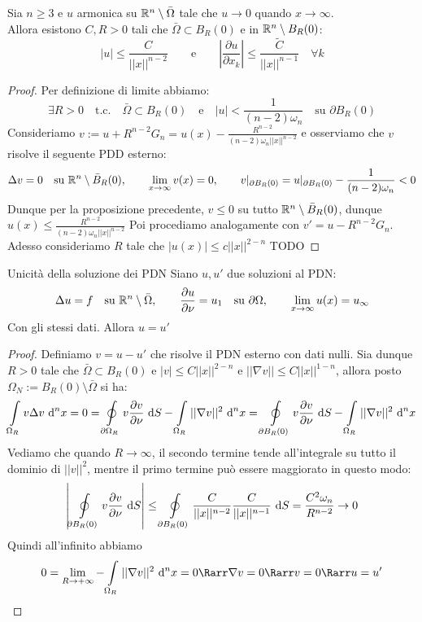 \documentclass{book}
\begin{document}
\begin{theorem}{}{}
    Sia $n\ge 3$ e $u$ armonica su $\mathbb{R}^n\setminus \bar{\Omega}$ tale che $u\to 0$ quando $x\to\infty$.\\
    Allora esistono $C,R>0$ tali che $\bar{\Omega}\subset B_R(0)$ e in $\mathbb{R}^n\setminus B_R(0)$:
    \[|u| \le \frac{C}{||x||^{n-2}}\qquad \text{e}\qquad \left|\frac{\partial u}{\partial x_k}\right|\le \frac{\tilde{C}}{||x||^{n-1}} \quad \forall k\]
\end{theorem}
\begin{proof}
    Per definizione di limite abbiamo:
    \[\exists R>0 \quad \text{t.c.} \quad \bar{\Omega}\subset B_R(0) \quad \text{e} \quad |u| <\frac{1}{(n-2)\omega_n} \quad \text{su } \partial B_R(0)\]
    Consideriamo $v:= u + R^{n-2}G_n = u(x) - \frac{R^{n-2}}{(n-2)\omega_n ||x||^{n-2}}$ e osserviamo che $v$ risolve il seguente PDD esterno:
    \[\Delta v = 0 \quad\text{su }\mathbb{R}^n \setminus\bar{B}_R(0), \qquad \lim_{x\to\infty}v(x) = 0, \qquad v|_{\partial B_R(0)} = u|_{\partial B_R(0)} - \frac{1}{(n-2)\omega_n} < 0\]
    Dunque per la proposizione precedente, $v \le 0$ su tutto $\mathbb{R}^n \setminus\bar{B}_R(0)$, dunque $u(x) \le \frac{R^{n-2}}{(n-2)\omega_n ||x||^{n-2}}$
    Poi procediamo analogamente con $v' = u - R^{n-2}G_n$.\\
    Adesso consideriamo $R$ tale che $|u(x)| \le c||x||^{2-n}$
    TODO
\end{proof}

\begin{theorem}{Unicità della soluzione dei PDN}{}
    Siano $u,u'$ due soluzioni al PDN:
    \[\Delta u = f \quad \text{su }\mathbb{R}^n\setminus \bar{\Omega},\qquad \frac{\partial u}{\partial \nu} = u_1 \quad \text{su }\partial\Omega, \qquad \lim_{x\to\infty}u(x) = u_\infty\]
    Con gli stessi dati. Allora $u=u'$
\end{theorem}
\begin{proof}
    Definiamo $v = u-u'$ che risolve il PDN esterno con dati nulli. Sia dunque $R>0$ tale che $\bar{\Omega}\subset B_R(0)$ e $|v|\le C||x||^{2-n}$ e $||\nabla v||\le C||x||^{1-n}$, allora posto $\Omega_N := B_R(0)\setminus \bar{\Omega}$ si ha:
    \[\int\limits_{\Omega_R} v\Delta v \text{ d}^n x = 0 = \oint\limits_{\partial \Omega_R} v \frac{\partial v}{\partial \nu}\text{ d} S - \int\limits_{\Omega_R} ||\nabla v||^2 \text{ d}^n x = \oint\limits_{\partial B_R(0)} v \frac{\partial v}{\partial \nu}\text{ d} S - \int\limits_{\Omega_R} ||\nabla v||^2 \text{ d}^n x\]
    Vediamo che quando $R\to \infty$, il secondo termine tende all'integrale su tutto il dominio di $||v||^2$, mentre il primo termine può essere maggiorato in questo modo:
    \[\left|\oint\limits_{\partial B_R(0)} v \frac{\partial v}{\partial \nu}\text{ d} S\right|\le \oint\limits_{\partial B_R(0)} \frac{C}{||x||^{n-2}} \frac{C}{||x||^{n-1}}\text{ d} S = \frac{C^2\omega_n}{R^{n-2}}\to 0\]
    Quindi all'infinito abbiamo
    \[0 = \lim_{R\to +\infty} -\int\limits_{\Omega_R} ||\nabla v||^2 \de^n x = 0 \Rarr \nabla v = 0 \Rarr v = 0 \Rarr u = u'\]
\end{proof}
\end{document}

